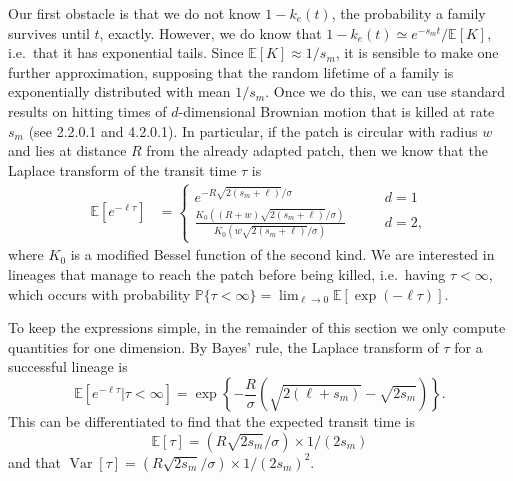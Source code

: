 \documentclass{article}
\newcommand{\citet}[1]{\cite{#1}}
\DeclareMathOperator{\var}{Var}
\renewcommand{\P}{\mathbb{P}}
\newcommand{\E}{\mathbb{E}}
\newcommand{\plr}[1]{{\it\color{blue}(#1)}}
\begin{document}
Our first obstacle is that we do not know $1-k_e(t)$, 
the probability a family survives until $t$, exactly.
However, we do know that $1-k_e(t) \simeq e^{-s_m t} / \E[K]$,
i.e.\ that it has exponential tails.
Since $\E[K] \approx 1/s_m$, it is sensible to make one further approximation,
supposing that the random lifetime of a family is exponentially distributed with mean $1/s_m$.
Once we do this, 
we can use standard results on hitting times of $d$-dimensional Brownian motion
that is killed at rate $s_m$ (see \citet{borodin2002handbook} 2.2.0.1 and 4.2.0.1).
In particular, if the patch is circular with radius $w$ and lies at distance
$R$ from the already adapted patch, then 
we know that the Laplace transform of the transit time $\tau$ is
\begin{align}
  \E[e^{-\ell \tau}] &=
    \begin{cases}
      e^{- R \sqrt{2(s_m+\ell)}/\sigma} \qquad & d=1 \\
      \frac{ K_0( (R+w)\sqrt{2(s_m+\ell)}/\sigma) }{ K_0( w\sqrt{2(s_m+\ell)}/\sigma) } \qquad & d=2  ,
    \end{cases} \label{eqn:borodinresult}
\end{align}
where $K_0$ is a modified Bessel function of the second kind.
We are interested in lineages that manage to reach the patch before being killed,
i.e.\ having $\tau < \infty$,
which occurs with probability
$\P\{\tau < \infty\} = \lim_{\ell \to 0} \E \left[\exp(-\ell \tau) \right]$. 

To keep the expressions simple, in the remainder of this section we only compute quantities for one dimension.
By Bayes' rule, the Laplace transform of $\tau$ for a successful lineage is
\begin{equation} \label{eqn:haplen_cdf}
\E[e^{-\ell \tau}|\tau<\infty]  = \exp\left\{{-\frac{R}{\sigma}\left(\sqrt{2(\ell+s_m)} - \sqrt{2s_m}\right)}\right\} .
\end{equation}
This can be differentiated to find that the expected transit time is
\begin{equation} 
  \E[\tau] = (R\sqrt{2s_m}/\sigma)\times 1/(2s_m) \label{eqn:mean_tau}
\end{equation}
and that $\var[\tau] = (R\sqrt{2s_m}/\sigma) \times 1/(2s_m)^2$.


\end{document}
